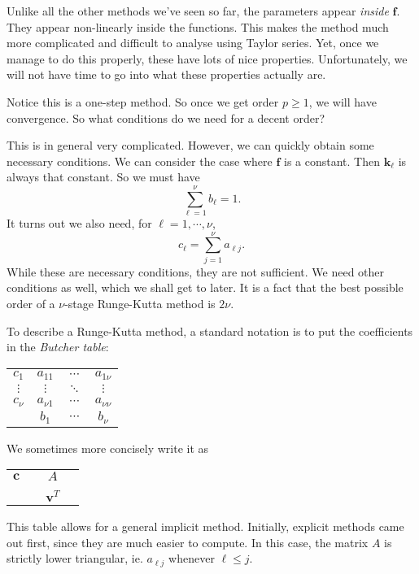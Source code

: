 \documentclass[a4paper]{article}
\begin{document}
Unlike all the other methods we've seen so far, the parameters appear \emph{inside} $\mathbf{f}$. They appear non-linearly inside the functions. This makes the method much more complicated and difficult to analyse using Taylor series. Yet, once we manage to do this properly, these have lots of nice properties. Unfortunately, we will not have time to go into what these properties actually are.

Notice this is a one-step method. So once we get order $p \geq 1$, we will have convergence. So what conditions do we need for a decent order?

This is in general very complicated. However, we can quickly obtain some necessary conditions. We can consider the case where $\mathbf{f}$ is a constant. Then $\mathbf{k}_\ell$ is always that constant. So we must have
\[
  \sum_{\ell = 1}^\nu b_\ell = 1.
\]
It turns out we also need, for $\ell = 1, \cdots, \nu$,
\[
  c_\ell = \sum_{j = 1}^\nu a_{\ell j}.
\]
While these are necessary conditions, they are not sufficient. We need other conditions as well, which we shall get to later. It is a fact that the best possible order of a $\nu$-stage Runge-Kutta method is $2 \nu$.

To describe a Runge-Kutta method, a standard notation is to put the coefficients in the \emph{Butcher table}:
\begin{center}
  \begin{tabular}{c|ccc}
    $c_1$ & $a_{11}$ & $\cdots$ & $a_{1\nu}$\\
    $\vdots$ & $\vdots$ & $\ddots$ & $\vdots$\\
    $c_\nu$ & $a_{\nu 1}$ & $\cdots$ & $a_{\nu\nu}$\\\hline
    & $b_1$ & $\cdots$ & $b_\nu$
  \end{tabular}
\end{center}
We sometimes more concisely write it as
\begin{center}
  \begin{tabular}{c|ccc}
    \\
    $\mathbf{c}$ &\vphantom{a} &{\Large $A$}&\vphantom{a}\\
    \\\hline
    & &$\mathbf{v}^T$
  \end{tabular}
\end{center}
This table allows for a general implicit method. Initially, explicit methods came out first, since they are much easier to compute. In this case, the matrix $A$ is strictly lower triangular, ie. $a_{\ell j}$ whenever $\ell \leq j$.
\end{document}
